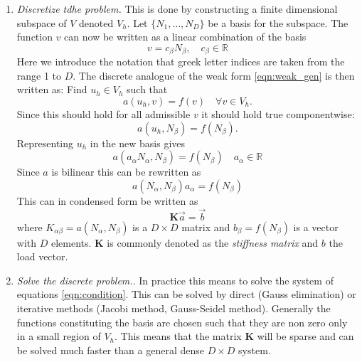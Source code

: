\documentclass[fem.tex]{subfiles}
\begin{document}
\begin{enumerate}
\item \emph{Discretize tdhe problem.} This is done by constructing a finite dimensional subspace of $V$ denoted $V_h$. Let $\{N_1, \ldots, N_D \}$  be a basis for the subspace. The function $v$ can now be written as a linear combination of the basis
%
\begin{equation} 
v =  c_\beta N_\beta, \quad c_\beta \in \mathbb{R} 
\end{equation}
%
Here we introduce the notation that greek letter indices are taken from the range 1 to $D$. The discrete analogue of the weak form \ref{eqn:weak_gen} is then written as: Find $u_h \in V_h$ such that
%
\begin{equation} 
\label{eqn_disc_analo}
  a(u_h,v) = f(v) \quad \forall v \in V_h.
\end{equation}
Since this should hold for all admissible $v$ it should hold true componentwise:
\begin{equation} 
    a(u_h, N_\beta) = f(N_\beta).
    \label{eqn:disc_part}
\end{equation}
%
Representing $u_h$ in the new basis gives
\begin{equation} 
    a \left(a_\alpha N_\alpha, N_\beta \right) = f(N_\beta ) \quad a_\alpha \in \mathbb{R}
    \label{eqn:u_new_base}
\end{equation}
%
Since $a$ is bilinear this can be rewritten as 
\begin{equation} 
    a \left( N_\alpha, N_\beta \right)a_\alpha = f(N_\beta)
    \label{eqn:final}
\end{equation}
%
This can in condensed form be written as
\begin{equation} 
    \mathbf{K} \vec{a} = \vec{b}
    \label{eqn:condition}
\end{equation}
where $K_{\alpha \beta} = a(N_\alpha, N_\beta)$ is a $D \times D$ matrix and $b_\beta = f(N_\beta)$ is a vector with $D$ elements. $\mathbf{K}$ is commonly denoted as the \textit{stiffness matrix} and $b$ the load vector.


\item \textit{Solve the discrete problem.}. In practice this means to solve the system of equations \ref{eqn:condition}. This can be solved by direct (Gauss elimination) or iterative methods (Jacobi method, Gauss-Seidel method). Generally the functions constituting the basis are chosen such that they are non zero only in a small region of $V_h$. This means that the matrix $\mathbf{K}$ will be sparse and can be solved much faster than a general dense $D \times D$ system.

\end{enumerate}
\end{document}
